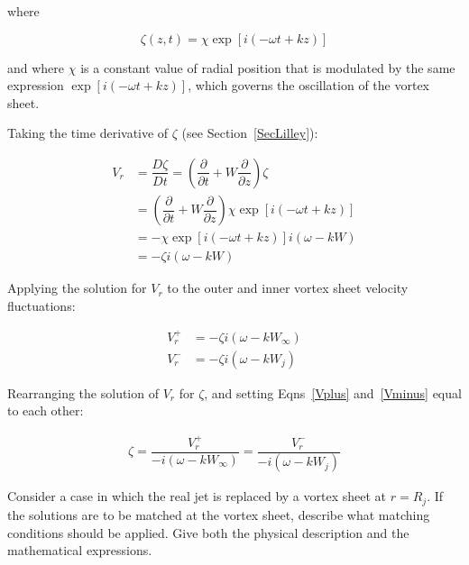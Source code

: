 \documentclass[]{aiaa-tc}%
\begin{document}
\noindent where

\begin{equation}
\zeta(z,t) = \chi \exp[i(-\omega t + kz)]
\end{equation}

\noindent and where $\chi$ is a constant value of radial position that is modulated by the same expression $\exp[i(-\omega t + kz)]$, which governs the oscillation of the vortex sheet.

Taking the time derivative of $\zeta$ (see Section~\ref{SecLilley}):

\begin{align*}
V_r &= \dfrac{D\zeta}{Dt} =
    \left(\dfrac{\partial}{\partial t} + W \dfrac{\partial}{\partial z}\right)
    \zeta \\
    &=\left(\dfrac{\partial}{\partial t} + W \dfrac{\partial}{\partial z}\right)
    \chi \exp[i(-\omega t + kz)]  \\
&= -\chi \exp[i(-\omega t + kz)] i ( \omega - kW )  \\
&= -\zeta i ( \omega - kW )
\end{align*}

Applying the solution for $V_r$ to the outer and inner vortex sheet velocity fluctuations:

\begin{align}
V_r^+ &= -\zeta i(\omega - kW_{\infty} )  \label{Vplus}\\
V_r^- &= -\zeta i(\omega - kW_j ) \label{Vminus}
\end{align}

Rearranging the solution of $V_r$ for $\zeta$, and setting Eqns~\ref{Vplus} and~\ref{Vminus} equal to each other:

\begin{align}
\zeta = \dfrac{V_r^+}{-i(\omega - kW_{\infty})}
    = \dfrac{V_r^-}{-i(\omega - kW_{j})}
\end{align}









Consider a case in which the real jet is replaced by a vortex sheet at $r = R_j$. If the solutions are to be matched at the vortex sheet, describe what matching conditions should be applied. Give both the physical description and the mathematical expressions.
\end{document}
